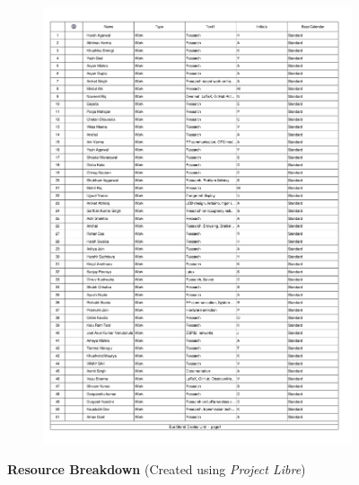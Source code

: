 \begin{figure}[H]
	\begin{subfigure}[b]{\textwidth}
		\centering
		\includegraphics[page=1,width=\textwidth,trim={0cm 0cm 0cm 0cm}, clip]{../../Images/Resources.pdf}
		\caption{}
	\end{subfigure}
	\caption{\textbf{Resource Breakdown} {(Created using \textit{Project Libre})}}
\end{figure}

\newpage

